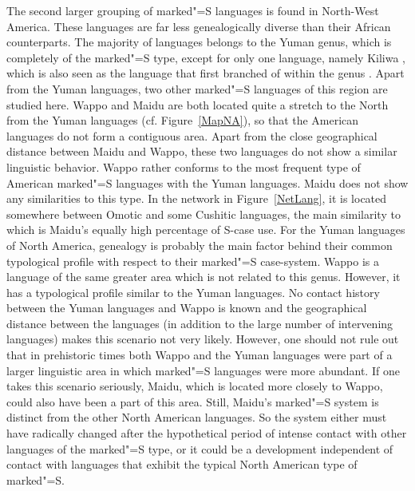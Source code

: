 The second larger grouping of marked"=S languages is found in North-West America. 
These languages are far less genealogically diverse than their African counterparts. 
The majority of languages belongs to the Yuman genus, which is completely of the marked"=S type, except for only one language, namely Kiliwa \citep{Mixco:1965}, which is also seen as the language that first branched of within the genus \citep{Joel:1998}. %
Apart from the Yuman languages, two other marked"=S languages of this region are studied here. 
Wappo and Maidu are both located quite a stretch to the North from the Yuman languages (cf. Figure~\ref{MapNA}), so that the American languages do not form a contiguous area.
Apart from the close geographical distance between Maidu and Wappo, these two languages do not show a similar linguistic behavior. 
Wappo rather conforms to the most frequent type of American marked"=S languages with the Yuman languages. 
Maidu does not show any similarities to this type.
In the network in Figure~\ref{NetLang}, it is located somewhere between Omotic and some Cushitic languages, the main similarity to which is Maidu's equally high percentage of S-case use.
For the Yuman languages of North America, genealogy is probably the main factor behind their common typological profile with respect to their marked"=S case-system.
Wappo is a language of the same greater area which is not related to this genus. 
However, it has a typological profile similar to the Yuman languages.
No contact history between the Yuman languages and Wappo is known and the geographical distance between the languages (in addition to the large number of intervening languages) makes this scenario not very likely. 
However, one should not rule out that in prehistoric times both Wappo and the Yuman languages were part of a larger linguistic area in which marked"=S languages were more abundant. 
If one takes this scenario seriously, Maidu, which is located more closely to Wappo, could also have been a part of this area. 
Still, Maidu's marked"=S system is distinct from the other North American languages. 
So the system either must have radically changed after the hypothetical period of intense contact with other languages of the marked"=S type, or it could be a development independent of contact with languages that exhibit the typical North American type of marked"=S.

